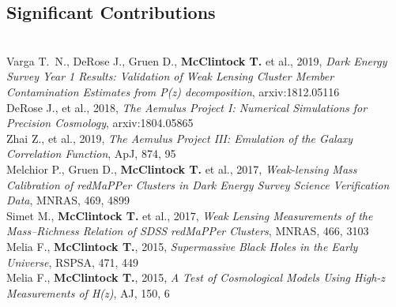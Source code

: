 \documentclass{res}
\begin{document}
\begin{resume}
\section{Significant Contributions}
\vspace{-8pt}
\hrulefill\\
Varga T.~N., DeRose J., Gruen D., {\bf McClintock T.} et al., 2019, {\it Dark Energy Survey Year 1 Results: Validation of Weak Lensing Cluster Member Contamination Estimates from P(z) decomposition}, arxiv:1812.05116\\
DeRose J., et al., 2018, {\it The Aemulus Project I: Numerical Simulations for Precision Cosmology}, arxiv:1804.05865\\
Zhai Z., et al., 2019, {\it The Aemulus Project III: Emulation of the Galaxy Correlation Function}, ApJ, 874, 95\\
Melchior P., Gruen D., {\bf McClintock T.} et al., 2017, {\it Weak-lensing Mass Calibration of redMaPPer Clusters in Dark Energy Survey Science Verification Data}, MNRAS, 469, 4899\\
Simet M., {\bf McClintock T.} et al., 2017, {\it Weak Lensing Measurements of the Mass--Richness Relation of SDSS redMaPPer Clusters}, MNRAS, 466, 3103\\
Melia F., {\bf McClintock T.}, 2015, {\it Supermassive Black Holes in the Early Universe}, RSPSA, 471, 449\\
Melia F., {\bf McClintock T.}, 2015, {\it A Test of Cosmological Models Using High-z Measurements of H(z)}, AJ, 150, 6\\


\end{resume}
\end{document}
